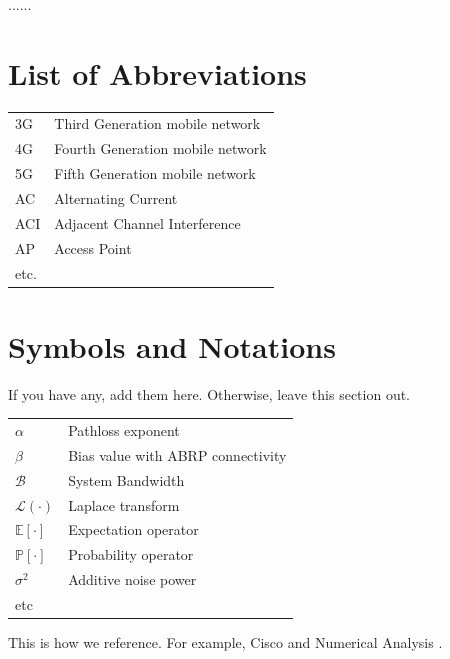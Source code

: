 \documentclass[12pt]{report}
\begin{document}
......

\newpage

\tableofcontents

\newpage

\listoffigures

\newpage

\listoftables

\newpage



\section*{List of Abbreviations}

\begin{tabular}{p{3cm} l}
	3G	& Third Generation mobile network\\
	4G	& Fourth Generation mobile network\\	
	5G	& Fifth Generation mobile network\\		
	AC    & Alternating Current \\
	ACI   & Adjacent Channel Interference \\
  AP		& Access Point \\
	etc.

\end{tabular}


\newpage

\section*{Symbols and Notations}

If you have any, add them here. Otherwise, leave this section out.

\begin{tabular}{p{3cm} l}
	$\alpha$						& Pathloss exponent \\
	$\beta$							& Bias value with ABRP connectivity \\
	$\mathcal{B}$				& System Bandwidth \\
	$\mathcal{L}(\cdot)$ & Laplace transform \\
  $\mathbb{E}[\cdot]$	& Expectation operator \\
  $\mathbb{P}[\cdot]$	& Probability operator \\
	$\sigma^2$					& Additive noise power \\	
etc
\end{tabular}


This is how we reference. For example, Cisco \cite{cisco} and Numerical Analysis \cite{bisect}. 
\end{document}
